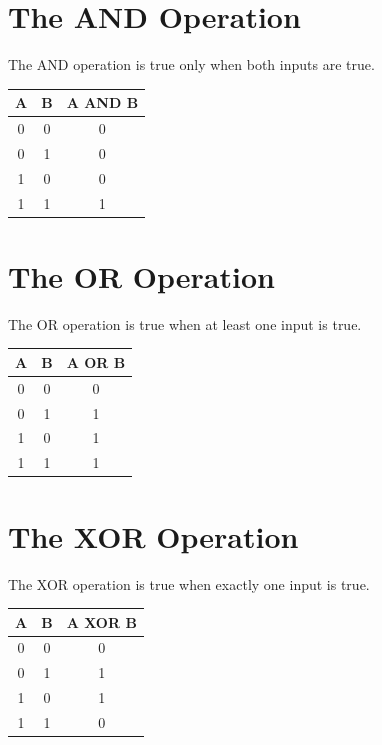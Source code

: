 \section{The AND Operation}

The AND operation is true only when both inputs are true.

\begin{center}
\begin{tabular}{ccc}
\toprule
A & B & A AND B \\
\midrule
0 & 0 & 0 \\
0 & 1 & 0 \\
1 & 0 & 0 \\
1 & 1 & 1 \\
\bottomrule
\end{tabular}
\end{center}

\section{The OR Operation}

The OR operation is true when at least one input is true.

\begin{center}
\begin{tabular}{ccc}
\toprule
A & B & A OR B \\
\midrule
0 & 0 & 0 \\
0 & 1 & 1 \\
1 & 0 & 1 \\
1 & 1 & 1 \\
\bottomrule
\end{tabular}
\end{center}

\section{The XOR Operation}

The XOR operation is true when exactly one input is true.

\begin{center}
\begin{tabular}{ccc}
\toprule
A & B & A XOR B \\
\midrule
0 & 0 & 0 \\
0 & 1 & 1 \\
1 & 0 & 1 \\
1 & 1 & 0 \\
\bottomrule
\end{tabular}
\end{center}

